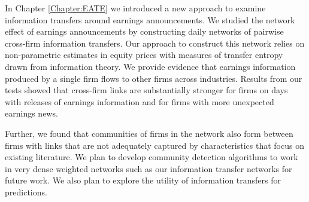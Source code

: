 
In Chapter \ref{Chapter:EATE} we introduced a new approach to examine information transfers around earnings announcements.  We studied the network effect of earnings announcements by constructing daily networks of pairwise cross-firm information transfers. Our approach to construct this network relies on non-parametric estimates in equity prices with measures of transfer entropy drawn from information theory.  We provide evidence that earnings information produced by a single firm flows to other firms across industries.  Results from our tests showed that cross-firm links are substantially stronger for firms on days with releases of earnings information and for firms with more unexpected earnings news.

Further,  we found that communities of firms in the network also form between firms with links that are not adequately captured by characteristics that focus on existing literature.  We plan to develop community detection algorithms to work in very dense weighted networks such as our information transfer networks for future work.  We also plan to explore the utility of information transfers for predictions.



%
%



